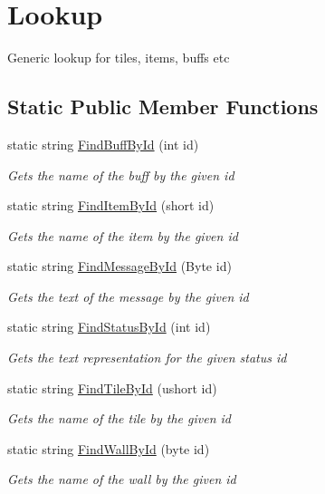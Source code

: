 \hypertarget{classOTA_1_1ID_1_1Lookup}{}\section{Lookup}
\label{classOTA_1_1ID_1_1Lookup}


Generic lookup for tiles, items, buffs etc  


\subsection*{Static Public Member Functions}
\begin{DoxyCompactItemize}
\item 
static string \hyperlink{classOTA_1_1ID_1_1Lookup_a6d3eb7f285707ea61ebfb2601cd2d69f}{Find\+Buff\+By\+Id} (int id)
\begin{DoxyCompactList}\small\item\em Gets the name of the buff by the given id \end{DoxyCompactList}\item 
static string \hyperlink{classOTA_1_1ID_1_1Lookup_aa41b1c7d46a9cf058ab61564af741ecc}{Find\+Item\+By\+Id} (short id)
\begin{DoxyCompactList}\small\item\em Gets the name of the item by the given id \end{DoxyCompactList}\item 
static string \hyperlink{classOTA_1_1ID_1_1Lookup_a395b7e663e2dc23ea7981e8615acfd9c}{Find\+Message\+By\+Id} (Byte id)
\begin{DoxyCompactList}\small\item\em Gets the text of the message by the given id \end{DoxyCompactList}\item 
static string \hyperlink{classOTA_1_1ID_1_1Lookup_af954303cdb8387d8452fb06d83dee53d}{Find\+Status\+By\+Id} (int id)
\begin{DoxyCompactList}\small\item\em Gets the text representation for the given status id \end{DoxyCompactList}\item 
static string \hyperlink{classOTA_1_1ID_1_1Lookup_a72c4d11759a074de76275e41aa570f15}{Find\+Tile\+By\+Id} (ushort id)
\begin{DoxyCompactList}\small\item\em Gets the name of the tile by the given id \end{DoxyCompactList}\item 
static string \hyperlink{classOTA_1_1ID_1_1Lookup_a974fbaeb0378aa23e2edc23d1dade3d4}{Find\+Wall\+By\+Id} (byte id)
\begin{DoxyCompactList}\small\item\em Gets the name of the wall by the given id \end{DoxyCompactList}\end{DoxyCompactItemize}
